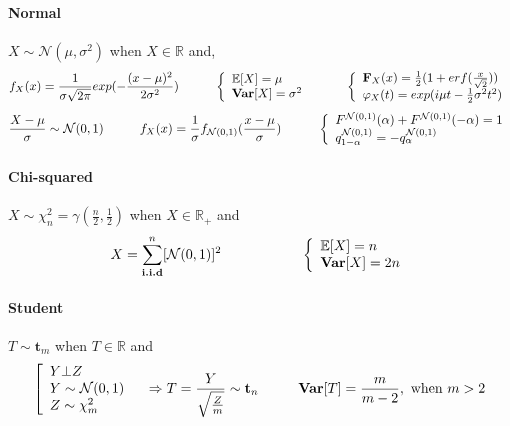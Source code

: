 \documentclass[a4paper,10pt]{article}
\begin{document}
\paragraph{Normal} $X \sim \mathcal{N}(\mu,\sigma^2)$ when $X \in \mathbb{R}$ and,
\[
f_{X}(x) = \frac{1}{\sigma \sqrt{2\pi}} exp (-\frac{(x-\mu)^2}{2\sigma^2})
\hspace{10mm}
\left\{
\begin{array}{l}
\mathbb{E}[X]=\mu \\
\textbf{Var}[X]=\sigma^2
\end{array}\right.
\hspace{10mm}
\left\{
\begin{array}{l}
\textbf{F}_X(x) =  \frac{1}{2}(1+erf(\frac{x}{\sqrt{2}})) \\
\varphi_{X}(t) = exp(i\mu t - \frac{1}{2}\sigma^2 t^2)
\end{array}\right.
\]
\[
\frac{X - \mu}{\sigma} \sim \mathcal{N}(0,1)
\hspace{10mm}
f_{X}(x) = \frac{1}{\sigma}f_{\mathcal{N}(0,1)}(\frac{x-\mu}{\sigma})
\hspace{10mm}
\left\{
\begin{array}{l}
F^{\mathcal{N}(0,1)} (\alpha) + F^{\mathcal{N}(0,1)}(-\alpha) = 1 \\
q^{\mathcal{N}(0,1)}_{1-\alpha} = - q^{\mathcal{N}(0,1)}_{\alpha} 
\end{array}\right.
\]

\paragraph{Chi-squared} $X\sim \chi^2_n= \gamma(\frac{n}{2}, \frac{1}{2})$ when  $X \in \mathbb{R}_+$ and
\[
X = \sum^{n}_{\textbf{i.i.d}} [ \mathcal{N}(0,1) ]^2
\hspace{20mm}
\left\{
\begin{array}{l}
\mathbb{E}[X]= n \\
\textbf{Var}[X]=2n
\end{array}\right.
\]


\paragraph{Student} $T\sim \textbf{t}_m$ when  $T \in \mathbb{R}$ and
\[
\left[
\begin{array}{l}
Y \bot Z                \\
Y \sim \mathcal{N}(0,1) \\
Z \sim  \chi^2_m  
\end{array}\right.
\hspace{3mm} \Rightarrow
T=\frac{Y}{\sqrt{\frac{Z}{m}}} \sim \textbf{t}_n
\hspace{10mm}
\textbf{Var}[T]= \frac{m}{m-2} , \text{  when } m>2 
\]
\end{document}
